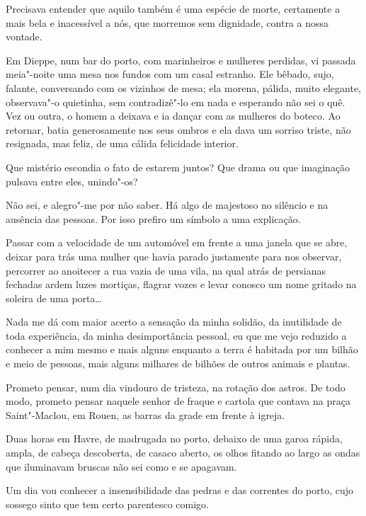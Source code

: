 Precisava entender que aquilo também é uma espécie de morte, certamente
a mais bela e inacessível a nós, que morremos sem dignidade,
contra a nossa vontade.

\asterisc

Em Dieppe, num bar do porto, com marinheiros e mulheres perdidas, vi
passada meia"-noite uma mesa nos fundos com um casal estranho. Ele
bêbado, sujo, falante, conversando com os vizinhos de mesa; ela morena,
pálida, muito elegante, observava"-o quietinha, sem contradizê"-lo em nada
e esperando não sei o quê. Vez ou outra, o homem a deixava e ia dançar
com as mulheres do boteco. Ao retornar, batia generosamente nos seus
ombros e ela dava um sorriso triste, não resignada, mas feliz, de uma
cálida felicidade interior.

Que mistério escondia o fato de estarem juntos? Que drama ou que
imaginação pulsava entre eles, unindo"-os?

Não sei, e alegro"-me por não saber. Há algo de majestoso no silêncio e
na ausência das pessoas. Por isso prefiro um símbolo a uma explicação.

\asterisc

Passar com a velocidade de um automóvel em frente a uma janela que se
abre, deixar para trás uma mulher que havia parado justamente para nos
observar, percorrer ao anoitecer a rua vazia de uma vila, na qual atrás
de persianas fechadas ardem luzes mortiças, flagrar vozes e levar
conosco um nome gritado na soleira de uma porta\ldots{}

Nada me dá com maior acerto a sensação da minha solidão, da inutilidade
de toda experiência, da minha desimportância pessoal, eu que me vejo
reduzido a conhecer a mim mesmo e mais alguns enquanto a terra é
habitada por um bilhão e meio de pessoas, mais alguns milhares de
bilhões de outros animais e plantas.

Prometo pensar, num dia vindouro de tristeza, na rotação dos astros. De
todo modo, prometo pensar naquele senhor de fraque e cartola que
contava na praça Saint"-Maclou, em Rouen, as barras da grade em frente à
igreja.

\asterisc

Duas horas em Havre, de madrugada no porto, debaixo de uma garoa
rápida, ampla, de cabeça descoberta, de casaco aberto, os olhos fitando
ao largo as ondas que iluminavam bruscas não sei como e se apagavam.

Um dia vou conhecer a insensibilidade das pedras e das correntes do
porto, cujo sossego sinto que tem certo parentesco comigo.

